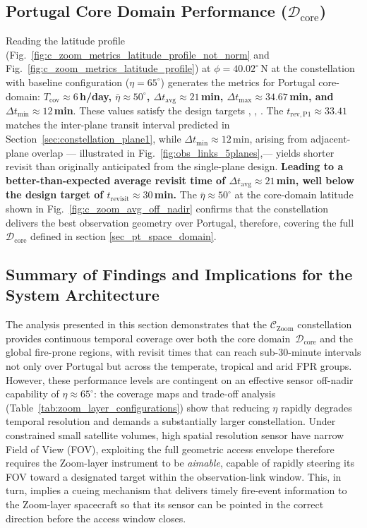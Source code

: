 \subsection{Portugal Core Domain Performance ($\mathcal{D}_{\text{core}}$)}
\label{sec:portugal_core_domain_metrics_derive_from_global_domain_results}

Reading the latitude profile (Fig.~\ref{fig:c_zoom_metrics_latitude_profile_not_norm} and Fig.~\ref{fig:c_zoom_metrics_latitude_profile}) at $\phi = 40.02^{\circ}$\,N at the constellation with baseline configuration ($\eta = 65^{\circ}$) generates the metrics for Portugal core-domain: \textbf{$T_{\text{cov}} \approx 6$\,h/day, $\bar{\eta} \approx 50^{\circ}$, $\Delta t_{\text{avg}} \approx 21$\,min, $\Delta t_{\max} \approx 34.67$\,min, and $\Delta t_{\min} \approx 12$\,min}.  These values satisfy the design targets , , . The $t_{\mathrm{rev,P1}} \approx 33.41$ matches the inter-plane transit interval predicted in Section~\ref{sec:constellation_plane1}, while $\Delta t_{\min} \approx 12$\,min, arising from adjacent-plane overlap --- illustrated in Fig.~\ref{fig:obs_links_5planes},---  yields shorter revisit than originally anticipated from the single-plane design. \textbf{Leading to a better-than-expected average revisit time of $\Delta t_{\text{avg}} \approx 21$\,min, well below the design target of $t_{\text{revisit}} \approx 30$\,min.}  The $\bar{\eta} \approx 50^{\circ}$ at the core-domain latitude shown in Fig.~\ref{fig:c_zoom_avg_off_nadir} confirms that the constellation delivers the best observation geometry over Portugal, therefore, covering the full $\mathcal{D}_{\text{core}}$ defined in section \ref{sec_pt_space_domain}.

\subsection{Summary of Findings and Implications for the System Architecture}
\label{sec:zoom_layer_findings_summary}

The analysis presented in this section demonstrates that the $\mathcal{C}_{\text{Zoom}}$ constellation provides continuous temporal coverage over both the core domain~$\mathcal{D}_{\text{core}}$ and the global fire-prone regions, with revisit times that can reach sub-30-minute intervals not only over Portugal but across the temperate, tropical and arid FPR groups.  However, these performance levels are contingent on an effective sensor off-nadir capability of $\eta \approx 65^{\circ}$: the coverage maps and trade-off analysis (Table~\ref{tab:zoom_layer_configurations}) show that reducing $\eta$ rapidly degrades temporal resolution and demands a substantially larger constellation. Under constrained small satellite volumes, high spatial resolution sensor have narrow Field of View (FOV), exploiting the full geometric access envelope therefore requires the Zoom-layer instrument to be \emph{aimable}, capable of rapidly steering its FOV toward a designated target within the observation-link window.  This, in turn, implies a cueing mechanism that delivers timely fire-event information to the Zoom-layer spacecraft so that its sensor can be pointed in the correct direction before the access window closes.

